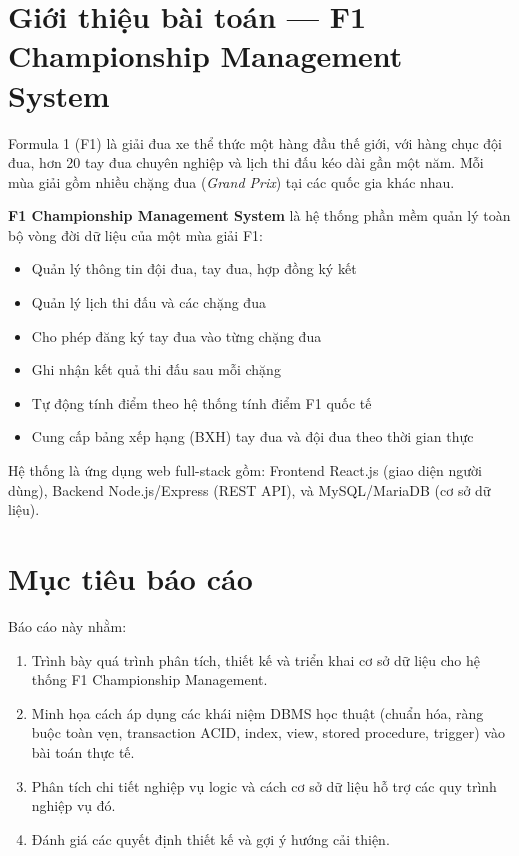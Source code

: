 \documentclass[13pt, a4paper]{report}
\begin{document}
\section{Giới thiệu bài toán --- F1 Championship Management System}

Formula 1 (F1) là giải đua xe thể thức một hàng đầu thế giới, với hàng chục đội đua, hơn 20 tay đua chuyên nghiệp và lịch thi đấu kéo dài gần một năm. Mỗi mùa giải gồm nhiều chặng đua (\textit{Grand Prix}) tại các quốc gia khác nhau.

\textbf{F1 Championship Management System} là hệ thống phần mềm quản lý toàn bộ vòng đời dữ liệu của một mùa giải F1:

\begin{itemize}[leftmargin=1.5cm]
  \item Quản lý thông tin đội đua, tay đua, hợp đồng ký kết
  \item Quản lý lịch thi đấu và các chặng đua
  \item Cho phép đăng ký tay đua vào từng chặng đua
  \item Ghi nhận kết quả thi đấu sau mỗi chặng
  \item Tự động tính điểm theo hệ thống tính điểm F1 quốc tế
  \item Cung cấp bảng xếp hạng (BXH) tay đua và đội đua theo thời gian thực
\end{itemize}

Hệ thống là ứng dụng web full-stack gồm: Frontend React.js (giao diện người dùng), Backend Node.js/Express (REST API), và MySQL/MariaDB (cơ sở dữ liệu).

\section{Mục tiêu báo cáo}

Báo cáo này nhằm:
\begin{enumerate}[leftmargin=1.5cm]
  \item Trình bày quá trình phân tích, thiết kế và triển khai cơ sở dữ liệu cho hệ thống F1 Championship Management.
  \item Minh họa cách áp dụng các khái niệm DBMS học thuật (chuẩn hóa, ràng buộc toàn vẹn, transaction ACID, index, view, stored procedure, trigger) vào bài toán thực tế.
  \item Phân tích chi tiết nghiệp vụ logic và cách cơ sở dữ liệu hỗ trợ các quy trình nghiệp vụ đó.
  \item Đánh giá các quyết định thiết kế và gợi ý hướng cải thiện.
\end{enumerate}
\end{document}
